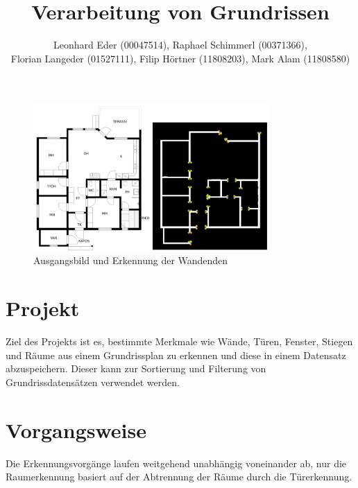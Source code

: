\documentclass[deutsch]{scrartcl}
\begin{document}
\title{Verarbeitung von Grundrissen} %

\author{Leonhard Eder (00047514), Raphael Schimmerl (00371366), \\Florian Langeder (01527111), Filip Hörtner (11808203), Mark Alam (11808580)}
\date{\vspace{-5ex}}




\maketitle

\begin{figure}[h!]
	
	\centering
	\includegraphics[width=0.8\textwidth]{mnz1.png}
	\caption{Ausgangsbild und Erkennung der Wandenden}
	\label{fig:erg}
\end{figure}


\section*{Projekt}
Ziel des Projekts ist es, bestimmte Merkmale wie Wände, Türen, Fenster, Stiegen und Räume aus einem Grundrissplan zu erkennen und diese in einem Datensatz abzuspeichern. Dieser kann zur Sortierung und Filterung von Grundrissdatensätzen verwendet werden.

\section*{Vorgangsweise}

Die Erkennungsvorgänge laufen weitgehend unabhängig voneinander ab, nur die Raumerkennung basiert auf der Abtrennung der Räume durch die Türerkennung.
\end{document}
